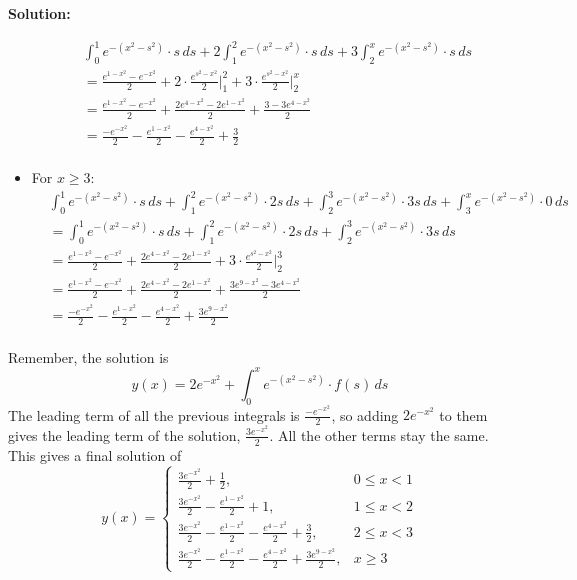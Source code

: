 \documentclass[12pt]{article}
\newenvironment{solution}{
    \textbf{Solution:}
    
}{
    
    \vspace{2em}
}
\begin{document}
\begin{solution}
\begin{itemize}
\[\begin{aligned}
            &\int_{0}^{1} e^{-(x^2 - s^2)} \cdot s \, ds + 2\int_{1}^{2} e^{-(x^2 - s^2)} \cdot s \, ds + 3\int_{2}^{x} e^{-(x^2 - s^2)} \cdot s \, ds\\
            &= \frac{e^{1-x^2} - e^{-x^2}}{2} + 2 \cdot \frac{e^{s^2 - x^2}}{2} \bigg|_{1}^{2} + 3 \cdot \frac{e^{s^2 - x^2}}{2} \bigg|_{2}^{x}\\
            &= \frac{e^{1-x^2} - e^{-x^2}}{2} + \frac{2e^{4-x^2} - 2e^{1-x^2}}{2} + \frac{3 - 3e^{4-x^2}}{2}\\
            &= \frac{-e^{-x^2}}{2} - \frac{e^{1-x^2}}{2} - \frac{e^{4-x^2}}{2} + \frac{3}{2}\\
        \end{aligned}
        \]
        \item For $x \geq 3$:
        \[
        \begin{aligned}
            &\int_{0}^{1} e^{-(x^2 - s^2)} \cdot s \, ds + \int_{1}^{2} e^{-(x^2 - s^2)} \cdot 2s \, ds + \int_{2}^{3} e^{-(x^2 - s^2)} \cdot 3s \, ds + \int_{3}^{x} e^{-(x^2 - s^2)} \cdot 0 \, ds\\
            &= \int_{0}^{1} e^{-(x^2 - s^2)} \cdot s \, ds + \int_{1}^{2} e^{-(x^2 - s^2)} \cdot 2s \, ds + \int_{2}^{3} e^{-(x^2 - s^2)} \cdot 3s \, ds\\
            &= \frac{e^{1-x^2} - e^{-x^2}}{2} + \frac{2e^{4-x^2} - 2e^{1-x^2}}{2} + 3 \cdot \frac{e^{s^2 - x^2}}{2} \bigg|_{2}^{3}\\
            &= \frac{e^{1-x^2} - e^{-x^2}}{2} + \frac{2e^{4-x^2} - 2e^{1-x^2}}{2} + \frac{3e^{9 - x^2} - 3e^{4 - x^2}}{2}\\
            &= \frac{-e^{-x^2}}{2} - \frac{e^{1-x^2}}{2} - \frac{e^{4-x^2}}{2} + \frac{3e^{9 - x^2}}{2}\\
        \end{aligned}
        \]
    \end{itemize}
Remember, the solution is
    \[
    y(x) = 2e^{-x^2} + \int_{0}^{x} e^{-(x^2 - s^2)} \cdot f(s) \, ds
    \]
The leading term of all the previous integrals is \(\frac{-e^{-x^2}}{2}\), so adding \(2e^{-x^2}\) to them gives the leading term of the solution, \(\frac{3e^{-x^2}}{2}\). All the other terms stay the same. This gives a final solution of
    \[
    y(x) = \begin{cases}
        \frac{3e^{-x^2}}{2} + \frac{1}{2}, & 0 \leq x < 1 \\
        \frac{3e^{-x^2}}{2} - \frac{e^{1-x^2}}{2} + 1, & 1 \leq x < 2 \\
        \frac{3e^{-x^2}}{2} - \frac{e^{1-x^2}}{2} - \frac{e^{4-x^2}}{2} + \frac{3}{2}, & 2 \leq x < 3 \\
        \frac{3e^{-x^2}}{2} - \frac{e^{1-x^2}}{2} - \frac{e^{4-x^2}}{2} + \frac{3e^{9 - x^2}}{2}, & x \geq 3
    \end{cases}
    \]
\end{solution}
\end{document}
